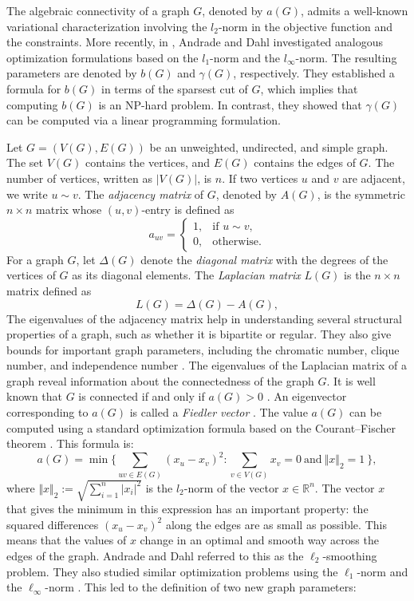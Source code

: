 \documentclass[12pt]{article}
\begin{document}
The algebraic connectivity of a graph $G$, denoted by $a(G)$,  admits a well-known variational characterization involving the $l_2$-norm in the objective function and the constraints. More recently, in \cite{enide-geir-2024}, Andrade and Dahl investigated analogous optimization formulations based on the $l_1$-norm and the $l_\infty$-norm. The resulting parameters are denoted by $b(G)$ and $\gamma (G)$, respectively. They established a formula for $b(G)$  in terms of the sparsest cut of $G$, which implies that computing $b(G)$ is an NP-hard problem. In contrast, they showed that $\gamma (G)$ can be computed via a linear programming formulation. 

 Let \(G = (V(G), E(G))\) be an unweighted, undirected, and simple graph. The set \(V(G)\) contains the vertices, and \(E(G)\) contains the edges of \(G\). The number of vertices, written as \(|V(G)|\), is \(n\). If two vertices \(u\) and \(v\) are adjacent, we write \(u \sim v\).  The \textit{adjacency matrix} of \(G\), denoted by \(A(G)\), is the symmetric \(n \times n\) matrix whose \((u,v)\)-entry is defined as
\[
a_{uv} = 
\begin{cases}
1, & \text{if } u \sim v,\\[4pt]
0, & \text{otherwise}.
\end{cases}
\]
 For a graph $G$, let $\Delta(G)$ denote the \textit{diagonal matrix} with the degrees of the vertices of $G$ as its diagonal elements.  The \textit{Laplacian matrix} $L(G)$ is the $n\times n$  matrix defined as 
$$
L(G)=\Delta(G)-A(G),
$$
The eigenvalues of the adjacency matrix help in understanding several structural properties of a graph, such as whether it is bipartite or regular. They also give bounds for important graph parameters, including the chromatic number, clique number, and independence number \cite{ipm-brouwer-haemers}.
The eigenvalues of the Laplacian matrix of a graph reveal information about the connectedness of the graph $G$.  It is well known that $G$ is connected if and only if $a(G) > 0$ \cite{alg-con, fiedler-1989}.
An eigenvector corresponding to $a(G)$ is called a \textit{Fiedler vector} \cite{enide-geir-2024}. The value \(a(G)\) can be computed using a standard optimization formula based on the Courant–Fischer theorem \cite{matrix-analysis}. This formula is:
 \begin{equation*}
a(G)=\min  \biggl\{\sum_{uv \in E(G)}(x_u - x_v)^2: \sum_{v \in V(G)} x_v =0 ~\mbox{and}~\Vert x \Vert _{2}=1\ \biggl\},
 \end{equation*} 
 where $\Vert x \Vert_2 := \sqrt{\sum\limits_{i=1}^n \vert x_i \vert^2}$ is the $l_2$-norm of the vector $x\in \mathbb{R}^n$. 
The vector \(x\) that gives the minimum in this expression has an important property: the squared differences \((x_u - x_v)^2\) along the edges are as small as possible. This means that the values of \(x\) change in an optimal and smooth way across the edges of the graph. Andrade and Dahl \cite{enide-geir-2024} referred to this as the \( \ell_2 \)-smoothing problem. They also studied similar optimization problems using the \( \ell_1 \)-norm and the \( \ell_\infty \)-norm \cite{enide-geir-2024}. This led to the definition of two new graph parameters:
\end{document}

